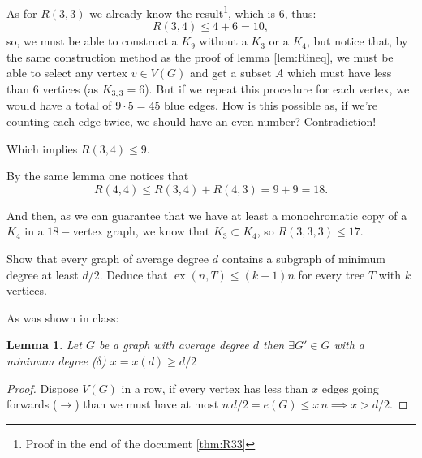 \documentclass[english]{IMTexam}
\newtheorem{lemma}{Lemma}
\DeclareMathOperator{\ex}{ex}
\begin{document}
\begin{questions}
\begin{solution}
			As for $ R(3,3) $ we already know the result\footnote{Proof in the end of the document \ref{thm:R33}}, which is $ 6 $, thus:
			\[ R(3,4)\leqslant 4+6=10, \]
			so, we must be able to construct a $ K_9 $ without a {\color{red} $ K_3 $} or a {\color{cyan} $ K_4 $}, but notice that, by the same construction method as the proof of lemma \ref{lem:Rineq}, we must be able to select any vertex $ v\in V(G) $ and get a subset $ A $ which must have less than $ 6 $ vertices (as $ K_{3,3}=6 $). But if we repeat this procedure for each vertex, we would have a total of $ 9\cdot 5=45 $ blue edges. How is this possible as, if we're counting each edge twice, we should have an even number? Contradiction!
			
			Which implies $ R(3,4)\leqslant 9 $.
			
			By the same lemma one notices that
			\[ R(4,4)\leqslant R(3,4)+R(4,3)=9+9=18. \]
			
			And then, as we can guarantee that we have at least a monochromatic copy of a $ K_{4} $ in a $ 18- $vertex graph, we know that $ K_3\subset K_4 $, so $ R(3,3,3)\leqslant 17 $.
		\end{solution}
		
		\question Show that every graph of average degree $ d $ contains a subgraph of minimum degree at least $ d/2 $. %
		Deduce that $ \ex(n, T)\leqslant (k - 1)n $  for every tree $ T $ with $ k $ vertices.
		
		\begin{solution}
			As was shown in class:
			
			\begin{lemma}\label{lem:l1trees}
				Let $ G $ be a graph with average degree $ d $ then $ \exists G'\in G $ with a minimum degree ($ \delta $) $ x=x(d)\geqslant d/2 $
			\end{lemma}
			
			\begin{proof}
				
				Dispose $ V(G) $ in a row, if every vertex has less than $ x $ edges going forwards ($ \rightarrow $) than we must have at most $ n\,d/2=e(G)\leqslant x\,n\implies x>d/2 $.
			\end{proof}
		


\end{solution}
\end{questions}
\end{document}
